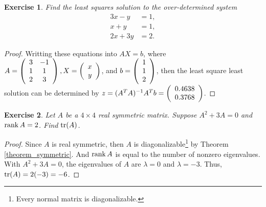 \documentclass[10pt]{book}
\newtheorem{exercise}{Exercise}[section]
\theoremstyle{definition}
\numberwithin{equation}{chapter}
\begin{document}
\begin{exercise}
Find the least squares solution to the over-determined system%
\begin{align*}
3x-y  &  =1,\\
x+y  &  =1,\\
2x+3y  &  =2.
\end{align*}
\end{exercise}
\begin{proof}
Writting these equations into $AX=b$, where $A = \left(\begin{array}
    [c]{cc}%
    3 & -1\\
    1 & 1\\
    2 & 3
    \end{array}\right), X = \left(\begin{array}
    [c]{c}%
    x\\
    y\\
    \end{array}\right)$, and $b = \left(\begin{array}
    [c]{c}%
    1\\
    1\\
    2
    \end{array}\right)$, then the least square least solution can be determined by $z = (A^TA)^{-1}A^T b = \left(\begin{array}
    [c]{c}%
    0.4638\\
    0.3768\\
    \end{array}\right)
    $.
\end{proof}

\medskip

\begin{exercise}{\bf *}
Let $A$ be a $4 \times 4$ real symmetric matrix. Suppose $A^2 + 3A = 0$ and $\rank A = 2$. Find ${\rm tr}(A)$.
\end{exercise}
\begin{proof}
Since $A$ is real symmetric, then $A$ is diagonalizable\footnote{Every normal matrix is diagonalizable\cite{21}.} by Theorem \ref{theorem_symmetric}. And $\rank A$ is equal to the number of nonzero eigenvalues. With $A^2 + 3A = 0$, the eigenvalues of $A$ are $\lambda = 0$ and $\lambda = -3$. Thus, ${\rm tr}(A) = 2(-3) = -6$.
\end{proof}

\medskip
\end{document}
